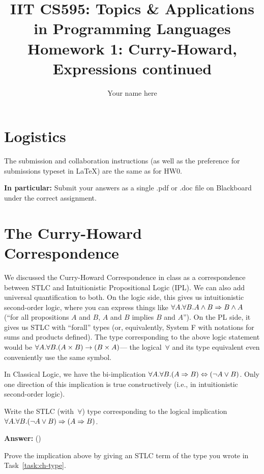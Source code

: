 \documentclass{article}
\title{IIT CS595: Topics \& Applications in Programming Languages\\
  {\large Homework 1: Curry-Howard, Expressions continued}}
\author{Your name here}
\begin{document}
\maketitle

\section*{Logistics}
The submission and collaboration instructions (as well as the preference
for submissions typeset in LaTeX) are the same as for HW0.

\textbf{In particular:}
Submit your answers as a single .pdf or .doc file  on Blackboard
under
the correct assignment. 

\section{The Curry-Howard Correspondence}

We discussed the Curry-Howard Correspondence in class as a correspondence
between STLC and Intuitionistic Propositional Logic (IPL).
%
We can also add universal quantification to both.
%
On the logic side, this gives us intuitionistic second-order logic,
where you can express
things like $\forall A. \forall B. A \land B \Rightarrow B \land A$
(``for all propositions $A$ and $B$, $A$ and $B$ implies $B$ and $A$'').
%
On the PL side, it gives us STLC with ``forall'' types (or, equivalently,
System F with notations for sums and products defined).
%
The type corresponding to the above logic statement would be
$\forall A. \forall B. (A \times B) \rightarrow (B \times A)$---
the logical~$\forall$ and its type equivalent even conveniently use the
same symbol.

In Classical Logic, we have the bi-implication
$\forall A. \forall B. (A \Rightarrow B) \Leftrightarrow (\lnot A \lor B)$.
%
Only one direction of this implication is true constructively (i.e., in
intuitionistic second-order logic).


\begin{task}\label{task:ch-type}
  Write the STLC (with~$\forall$) type corresponding to
  the logical implication $\forall A. \forall B. (\lnot A \lor B) \Rightarrow (A \Rightarrow B)$.
\end{task}

\textbf{Answer:}
\kwforall {\alpha} {\kwforall {\beta} {\kwarr{(\kwsum{(\kwarr{\alpha}{\kwvoid})}{\beta})}({\kwarr{\alpha}{\beta}})}}

\begin{task}
  Prove the implication above by giving an STLC term of the type you wrote in
  Task~\ref{task:ch-type}.
\end{task}
\end{document}

